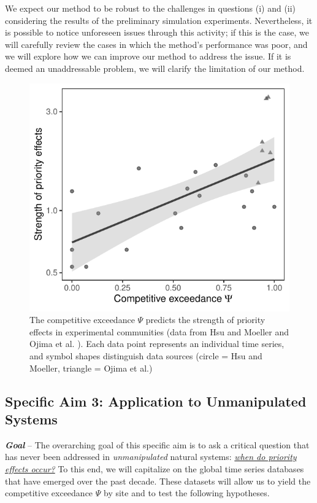 \documentclass[12pt, class=article, crop=false]{standalone}
\begin{document}
We expect our method to be robust to the challenges in questions (i) and (ii) considering the results of the preliminary simulation experiments.
Nevertheless, it is possible to notice unforeseen issues through this activity; if this is the case, we will carefully review the cases in which the method's performance was poor, and we will explore how we can improve our method to address the issue.
If it is deemed an unaddressable problem, we will clarify the limitation of our method.

\begin{figure}
    \includegraphics[scale=0.6]{output/figure_exp.pdf}
    \caption{The competitive exceedance $\Psi$ predicts the strength of priority effects in experimental communities (data from Hsu and Moeller \citep{hsu_metabolic_2021} and Ojima et al. \citep{ojima_priority_2022}).
    Each data point represents an individual time series, and symbol shapes distinguish data sources (circle = Hsu and Moeller, triangle = Ojima et al.)}
    \label{fig:experiment}
\end{figure}

\subsection*{Specific Aim 3: Application to Unmanipulated Systems}

\textbf{\textit{Goal}} -- 
The overarching goal of this specific aim is to ask a critical question that has never been addressed in \textit{unmanipulated} natural systems: \ul{\textit{when do priority effects occur?}}
To this end, we will capitalize on the global time series databases that have emerged over the past decade.
These datasets will allow us to yield the competitive exceedance $\Psi$ by site and to test the following hypotheses.
\end{document}
